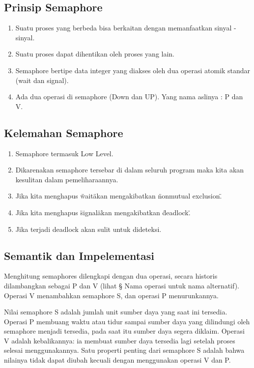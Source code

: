 	\subsection{Prinsip Semaphore}
	
		\begin{enumerate}

			\item Suatu proses yang berbeda bisa berkaitan dengan memanfaatkan sinyal - sinyal.
			\item Suatu proses dapat dihentikan oleh proses yang lain.
			\item Semaphore bertipe data integer yang diakses oleh dua operasi atomik standar (wait dan signal).
			\item Ada dua operasi di semaphore (Down dan UP). Yang nama aslinya : P dan V.
		
		\end{enumerate}

	\subsection{Kelemahan Semaphore}
	
		\begin{enumerate}

			\item Semaphore termasuk Low Level.
			\item Dikarenakan semaphore tersebar di dalam seluruh program maka kita akan kesulitan dalam pemeliharaannya.
			\item Jika kita menghapus \"wait\" akan mengakibatkan \"nonmutual exclusion\".
			\item Jika kita menghapus \"signal\" akan mengakibatkan \"deadlock\".
			\item Jika terjadi deadlock akan sulit untuk dideteksi.

		\end{enumerate}
		
	\subsection{Semantik dan Impelementasi}
		Menghitung semaphores dilengkapi dengan dua operasi, secara historis dilambangkan sebagai P dan V (lihat § Nama operasi untuk nama alternatif). 
		Operasi V menambahkan semaphore S, dan operasi P menurunkannya.

		Nilai semaphore S adalah jumlah unit sumber daya yang saat ini tersedia. Operasi P membuang waktu atau tidur sampai sumber daya yang dilindungi oleh 
		semaphore menjadi tersedia, pada saat itu sumber daya segera diklaim. Operasi V adalah kebalikannya: ia membuat sumber daya tersedia lagi setelah proses
		selesai menggunakannya. Satu properti penting dari semaphore S adalah bahwa nilainya tidak dapat diubah kecuali dengan menggunakan operasi V dan P.

